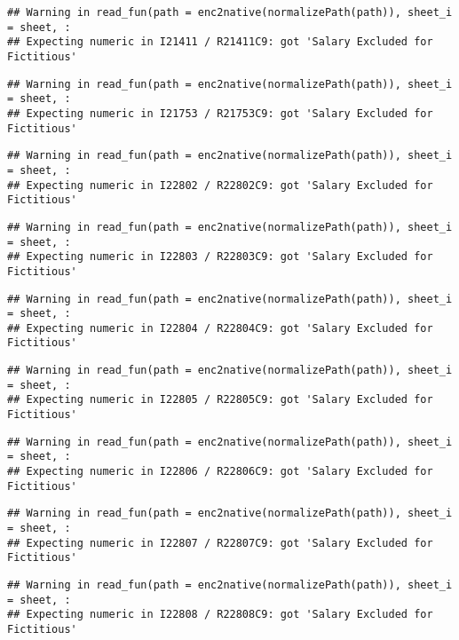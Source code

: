 \documentclass[
]{article}
\begin{document}
\begin{verbatim}
## Warning in read_fun(path = enc2native(normalizePath(path)), sheet_i = sheet, :
## Expecting numeric in I21411 / R21411C9: got 'Salary Excluded for Fictitious'
\end{verbatim}

\begin{verbatim}
## Warning in read_fun(path = enc2native(normalizePath(path)), sheet_i = sheet, :
## Expecting numeric in I21753 / R21753C9: got 'Salary Excluded for Fictitious'
\end{verbatim}

\begin{verbatim}
## Warning in read_fun(path = enc2native(normalizePath(path)), sheet_i = sheet, :
## Expecting numeric in I22802 / R22802C9: got 'Salary Excluded for Fictitious'
\end{verbatim}

\begin{verbatim}
## Warning in read_fun(path = enc2native(normalizePath(path)), sheet_i = sheet, :
## Expecting numeric in I22803 / R22803C9: got 'Salary Excluded for Fictitious'
\end{verbatim}

\begin{verbatim}
## Warning in read_fun(path = enc2native(normalizePath(path)), sheet_i = sheet, :
## Expecting numeric in I22804 / R22804C9: got 'Salary Excluded for Fictitious'
\end{verbatim}

\begin{verbatim}
## Warning in read_fun(path = enc2native(normalizePath(path)), sheet_i = sheet, :
## Expecting numeric in I22805 / R22805C9: got 'Salary Excluded for Fictitious'
\end{verbatim}

\begin{verbatim}
## Warning in read_fun(path = enc2native(normalizePath(path)), sheet_i = sheet, :
## Expecting numeric in I22806 / R22806C9: got 'Salary Excluded for Fictitious'
\end{verbatim}

\begin{verbatim}
## Warning in read_fun(path = enc2native(normalizePath(path)), sheet_i = sheet, :
## Expecting numeric in I22807 / R22807C9: got 'Salary Excluded for Fictitious'
\end{verbatim}

\begin{verbatim}
## Warning in read_fun(path = enc2native(normalizePath(path)), sheet_i = sheet, :
## Expecting numeric in I22808 / R22808C9: got 'Salary Excluded for Fictitious'
\end{verbatim}
\end{document}
